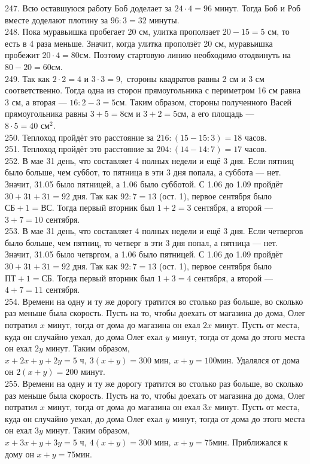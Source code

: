 \documentclass[12pt]{article}
\begin{document}
247. Всю оставшуюся работу Боб доделает за $24\cdot4=96$ минут. Тогда Боб и Роб вместе доделают плотину за $96:3=32$ минуты.\\
248. Пока муравьишка пробегает 20 см, улитка проползает $20-15=5$ см, то есть в 4 раза меньше. Значит, когда улитка проползёт 20 см, муравьишка пробежит $20\cdot4=80$см. Поэтому стартовую линию необходимо отодвинуть на $80-20=60$см.\\
249. Так как $2\cdot2=4$ и $3\cdot3=9,$ стороны квадратов равны 2 см и 3 см соответственно. Тогда одна из сторон прямоугольника с периметром 16 см равна 3 см, а вторая --- $16:2-3=5$см. Таким образом, стороны полученного Васей прямоугольника равны $3+5=8$см и $3+2=5$см, а его площадь --- $8\cdot5=40\text{ см}^2.$\\
250. Теплоход пройдёт это расстояние за $216:(15-15:3)=18$ часов.\\
251. Теплоход пройдёт это расстояние за $204:(14-14:7)=17$ часов.\\
252. В мае 31 день, что составляет 4 полных недели и ещё 3 дня. Если пятниц было больше, чем суббот, то пятница в эти 3 дня попала, а суббота --- нет. Значит, 31.05 было пятницей, а 1.06 было субботой. С 1.06 до 1.09 пройдёт $30+31+31=92$ дня. Так как $92:7=13$ (ост. 1), первое сентября было $\text{СБ}+1=\text{ВС}.$ Тогда первый вторник был $1+2=3$ сентября, а второй --- $3+7=10$ сентября.\\
253. В мае 31 день, что составляет 4 полных недели и ещё 3 дня. Если четвергов было больше, чем пятниц, то четверг в эти 3 дня попал, а пятница --- нет. Значит, 31.05 было четвргом, а 1.06 было пятницей. С 1.06 до 1.09 пройдёт $30+31+31=92$ дня. Так как $92:7=13$ (ост. 1), первое сентября было $\text{ПТ}+1=\text{СБ}.$ Тогда первый вторник был $1+3=4$ сентября, а второй --- $4+7=11$ сентября.\\
254. Времени на одну и ту же дорогу тратится во столько раз больше, во сколько раз меньше была скорость. Пусть на то, чтобы доехать от магазина до дома, Олег потратил $x$ минут, тогда от дома до магазина он ехал $2x$ минут. Пусть от места, куда он случайно уехал, до дома Олег ехал $y$ минут, тогда от дома до этого места он ехал $2y$ минут. Таким образом, $x+2x+y+2y=5\text{ ч},\ 3(x+y)=300\text{ мин},\ x+y=100$мин. Удалялся от дома он $2(x+y)=200$ минут.\\
255. Времени на одну и ту же дорогу тратится во столько раз больше, во сколько раз меньше была скорость. Пусть на то, чтобы доехать от магазина до дома, Олег потратил $x$ минут, тогда от дома до магазина он ехал $3x$ минут. Пусть от места, куда он случайно уехал, до дома Олег ехал $y$ минут, тогда от дома до этого места он ехал $3y$ минут. Таким образом, $x+3x+y+3y=5\text{ ч},\ 4(x+y)=300\text{ мин},\ x+y=75$мин. Приближался к дому он $x+y=75$мин.\\
\end{document}
